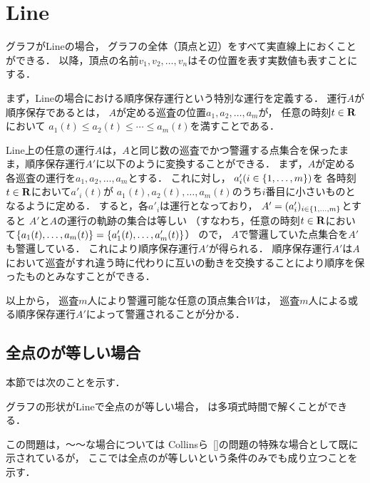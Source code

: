 
\section{Line}
\label{section: line}

グラフがLineの場合，
グラフの全体（頂点と辺）をすべて実直線上におくことができる．
以降，頂点の名前$v_1, v_2, \ldots, v_n$はその位置を表す実数値も表すことにする．

まず，Lineの場合における順序保存運行という特別な運行を定義する．
運行$A$が順序保存であるとは，
$A$が定める巡査の位置$a_1, a_2, \ldots, a_m$が，
任意の時刻$t \in \mathbf R$において
$a_1(t) \leq a_2(t) \leq \cdots \leq a_m(t)$を満すことである．

Line上の任意の運行$A$は，$A$と同じ数の巡査でかつ警邏する点集合を保ったまま，順序保存運行$A'$に以下のように変換することができる．
%
まず，$A$が定める各巡査の運行を$a_1, a_2, \ldots, a_m$とする．
これに対し，
$a'_i (i \in \left\{{1, \ldots, m}\right\})$を
各時刻$t \in \mathbf R$において$a' _i(t)$が
$a_1(t), a_2(t), \ldots, a_m(t)$のうち$i$番目に小さいものとなるように定める．
すると，各$a' _i$は運行となっており，
$A' = (a' _i)_{ i \in \left\{{1,\ldots, m}\right\} }$とすると
$A'$と$A$の運行の軌跡の集合は等しい
（すなわち，任意の時刻$t \in \mathbf R$において$\left\{{a_1(t), \ldots, a_m(t)}\right\} = \left\{{a'_1(t), \ldots, a'_m(t)}\right\}$）
ので，
$A$で警邏していた点集合を$A'$も警邏している．
これにより順序保存運行$A'$が得られる．
%
順序保存運行$A'$は$A$において巡査がすれ違う時に代わりに互いの動きを交換することにより順序を保ったものとみなすことができる．

以上から，
巡査$m$人により警邏可能な任意の頂点集合$W$は，
巡査$m$人による或る順序保存運行$A'$によって警邏されることが分かる．





\subsection{全点の{\idletime}が等しい場合}
\label{subsec:LineUnaryTimelimit}




本節では次のことを示す．

\begin{theo}
  \label{theo:LineEqualTimelimit}
  グラフの形状がLineで全点の{\idletime}が等しい場合，
  {\patrolling}は多項式時間で解くことができる．
\end{theo}

この問題は，～～な場合については Collinsら~\ref{}の問題の特殊な場合として既に示されているが，
ここでは全点の{\idletime}が等しいという条件のみでも成り立つことを示す．


